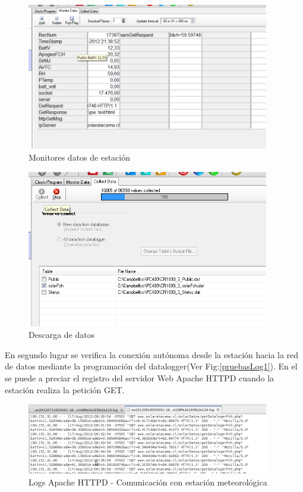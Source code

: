 \begin{figure}[h!]
        \centering
        \includegraphics[width=300pt]{images/pruebas4}
        \caption{Monitores datos de estación}
        \label{pruebas4}
\end{figure}
\begin{figure}[h!]
        \centering
        \includegraphics[width=300pt]{images/pruebas5}
        \caption{Descarga de datos}
        \label{pruebas5}
\end{figure}

\newpage
En segundo lugar se verifica la conexión autónoma desde la estación hacia la red de datos mediante la programación del datalogger(Ver Fig:\ref{pruebasLog1}). En el se puede a preciar el registro del servidor Web Apache HTTPD cuando la estación realiza la petición GET.

\begin{figure}[h!]
        \centering
        \includegraphics[width=300pt]{images/pruebasLog1}
        \caption{Logs Apache HTTPD - Comunicación con estación meteorológica}
        \label{prubasLog1}
\end{figure}

